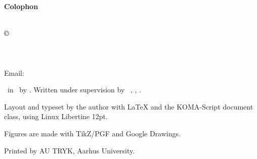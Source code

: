 \documentclass[../main.tex]{subfiles} %
\begin{document}
\thispagestyle{empty} %

\vspace*{\fill} %

\begin{center} %
    \textbf{\textsf{Colophon}} %
\end{center}
\vspace{1em} %

\noindent %
\textsl{\Title}\\

\noindent
$\copyright$ \Year\ \Author\\
\Department\\
\University\\
\DepartmentAddress\\
Email: \AuthorEmail \vspace{1.5em} %



\noindent %
\Doctype\ in \MakeLowercase{\SubjectOfStudy}\ by \Author. Written under supervision by \SupervisorTitle\ \Supervisor, \Department, \University.
\vspace{.5em} %

\noindent %
Layout and typeset by the author with LaTeX and the KOMA-Script document class, using Linux Libertine 12pt.
\vspace{.5em} %

\noindent %
Figures are made with TikZ/PGF and Google Drawings.
\vspace{.5em} %

\noindent %
Printed by AU TRYK, Aarhus University.

\end{document}
